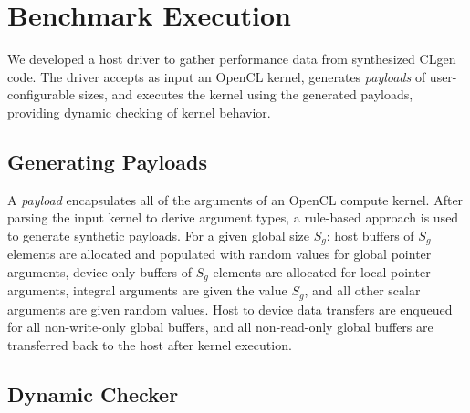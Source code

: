 \section{Benchmark Execution}\label{sec:driver}

We developed a host driver to gather performance data from synthesized CLgen code. The driver accepts as input an OpenCL kernel, generates \emph{payloads} of user-configurable sizes, and executes the kernel using the generated payloads, providing dynamic checking of kernel behavior.

\subsection{Generating Payloads}

A \emph{payload} encapsulates all of the arguments of an OpenCL compute kernel. After parsing the input kernel to derive argument types, a rule-based approach is used to generate synthetic payloads. For a given global size $S_g$: host buffers of $S_g$ elements are allocated and populated with random values for global pointer arguments, device-only buffers of $S_g$ elements are allocated for local pointer arguments, integral arguments are given the value $S_g$, and all other scalar arguments are given random values. Host to device data transfers are enqueued for all non-write-only global buffers, and all non-read-only global buffers are transferred back to the host after kernel execution.

\subsection{Dynamic Checker}

